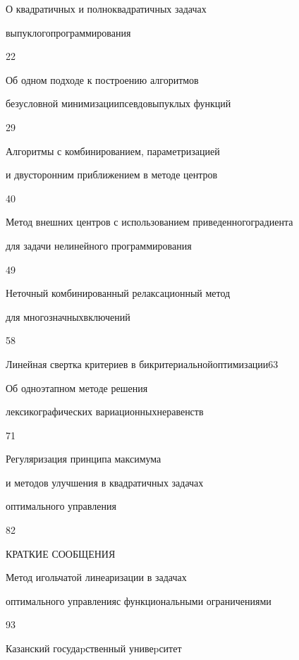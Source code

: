 

{О квадратичных и полноквадратичных задачах


выпуклого\newline программирования}{22}




{Об одном подходе к построению алгоритмов


безусловной минимизации\newline псевдовыпуклых функций}{29}




{Алгоритмы с комбинированием, параметризацией\newline


и двусторонним приближением в методе центров}{40}




{Метод внешних центров с использованием приведенного\newline градиента


для задачи нелинейного программирования}{49}




{Неточный комбинированный релаксационный метод


для многозначных\newline включений}{58}




{Линейная свертка критериев в бикритериальной\newline оптимизации}{63}




{Об одноэтапном методе решения


лексикографических вариационных\newline неравенств}{71}




{Регуляризация принципа максимума\newline


и методов улучшения в квадратичных задачах


оптимального управления}{82}








\bigskip


{\centerline{КРАТКИЕ СООБЩЕНИЯ}}


\bigskip







{Метод игольчатой линеаризации в задачах


оптимального управления\newline с функциональными ограничениями}{93}


\bigskip













\vfill


\noindent\raisebox{2pt}{\copyright} Казанский госудаpственный унивеpситет





